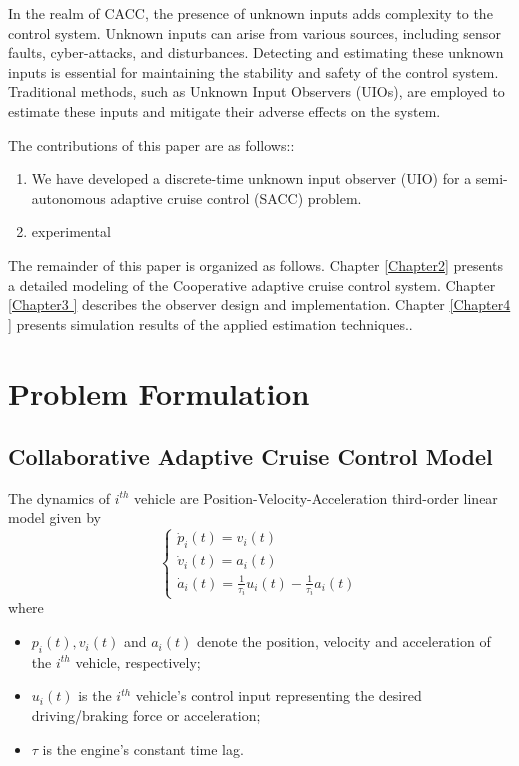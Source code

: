 \documentclass[letterpaper, 10 pt, conference]{ieeeconf}  %
\begin{document}
In the realm of CACC, the presence of unknown inputs adds complexity to the control system. Unknown inputs can arise from various sources, including sensor faults, cyber-attacks, and disturbances. Detecting and estimating these unknown inputs is essential for maintaining the stability and safety of the control system. Traditional methods, such as Unknown Input Observers (UIOs), are employed to estimate these inputs and mitigate their adverse effects on the system.





{\color{red} The contributions of this paper are as follows::
\begin{enumerate}
\item We have developed a discrete-time unknown input observer (UIO) for a semi-autonomous adaptive cruise control (SACC) problem.
\item experimental 
\end{enumerate}
The remainder of this paper is organized as follows. Chapter \ref{Chapter2} presents a detailed modeling of the Cooperative adaptive cruise control system. Chapter \ref{Chapter3
} describes the observer design and implementation. Chapter \ref{Chapter4
} presents simulation results of the applied estimation techniques..}



\section{Problem Formulation}



\subsection{Collaborative Adaptive Cruise Control Model}
The dynamics of $i^{th}$ vehicle are Position-Velocity-Acceleration third-order linear model given by
\begin{equation}\label{eq_1}
      \left\{ \begin{array}{l}
        \dot{p}_i(t) =v_i(t) \\
        \dot{v}_i(t)  =a_i(t) \\
        \dot{a}_i(t)  =\frac{1}{\tau_i} u_i(t)-\frac{1}{\tau_i} a_i(t)\end{array}\right.
\end{equation}  
where
\begin{itemize}
\item $p_i(t), v_i(t)$ and $a_i(t)$ denote the position, velocity and
acceleration of the $i^{th}$  vehicle, respectively;
\item $u_i(t)$ is the $i^{th}$ vehicle's control input representing the desired
driving/braking force or acceleration;
 \item $\tau$ is the engine's constant time lag. 
 \end{itemize}
 
\end{document}
